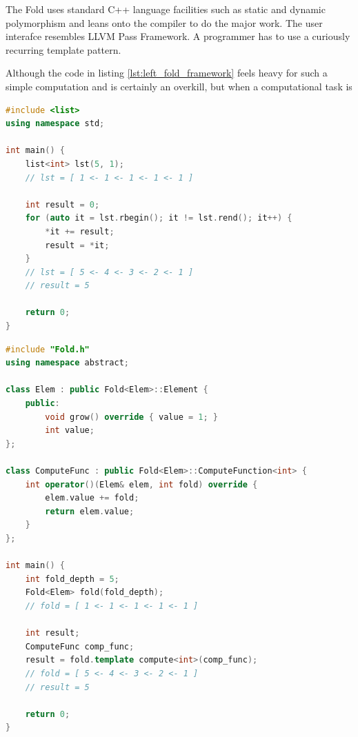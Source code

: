 The Fold uses standard C++ language facilities such as static and dynamic polymorphism and leans onto the compiler to do the major work. The user interafce resembles LLVM Pass Framework. A programmer has to use a curiously recurring template pattern.

\quad Although the code in listing \ref{lst:left_fold_framework} feels heavy for such a simple computation and is certainly an overkill, but when a computational task is 

\begin{lstlisting}[caption={Left fold computation using standard STL list class template},label={lst:left_fold_list},language=C++]
#include <list>
using namespace std;

int main() {
    list<int> lst(5, 1);
    // lst = [ 1 <- 1 <- 1 <- 1 <- 1 ]
    
    int result = 0;
    for (auto it = lst.rbegin(); it != lst.rend(); it++) {
        *it += result;
        result = *it;
    }
    // lst = [ 5 <- 4 <- 3 <- 2 <- 1 ]
    // result = 5
    
    return 0;
}
\end{lstlisting}


\begin{lstlisting}[caption={Left fold computation using our Fold computational framework},label={lst:left_fold_framework},language=C++]
#include "Fold.h"
using namespace abstract;

class Elem : public Fold<Elem>::Element {
    public:
        void grow() override { value = 1; }
        int value;
};

class ComputeFunc : public Fold<Elem>::ComputeFunction<int> {
    int operator()(Elem& elem, int fold) override {
        elem.value += fold;
        return elem.value;
    }
};

int main() {
    int fold_depth = 5;
    Fold<Elem> fold(fold_depth);
    // fold = [ 1 <- 1 <- 1 <- 1 <- 1 ]
    
    int result;
    ComputeFunc comp_func;
    result = fold.template compute<int>(comp_func);
    // fold = [ 5 <- 4 <- 3 <- 2 <- 1 ]
    // result = 5
    
    return 0;
}
\end{lstlisting}


